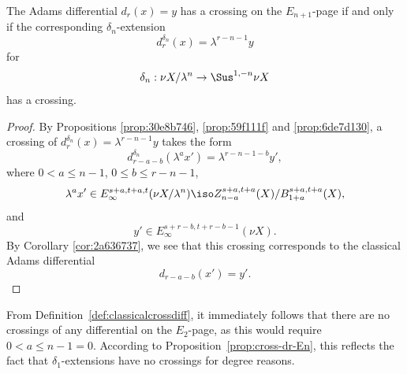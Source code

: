 \documentclass{amsart}
\numberwithin{equation}{section}
\begin{document}
\begin{proposition}\label{prop:cross-dr-En}
    The Adams differential $d_r(x)=y$ has a crossing on the $E_{n+1}$-page if and only if the corresponding $\delta_n$-extension
    $$d^{\delta_n}_r(x)=\lambda^{r-n-1}y$$
    for
    $$\delta_{n}:\nu X/\lambda^{n}\to \Sus^{1,-n}\nu X$$
    has a crossing.
\end{proposition}
\begin{proof}
    By Propositions \ref{prop:30e8b746}, \ref{prop:59f111f} and \ref{prop:6de7d130}, a crossing of $d^{\delta_n}_r(x)=\lambda^{r-n-1}y$ takes the form
    $$d^{\delta_n}_{r-a-b}(\lambda^a x')=\lambda^{r-n-1-b}y',$$
    where $0<a\le n-1$, $0\le b\le r-n-1$, 
    $$\lambda^a x'\in E_\infty^{s+a,t+a,t}(\nu X/\lambda^n)\iso Z_{n-a}^{s+a,t+a}(X)/B_{1+a}^{s+a,t+a}(X),$$
    and
    $$y'\in E_\infty^{s+r-b, t+r-b-1}(\nu X).$$
    By Corollary \ref{cor:2a636737}, we see that this crossing corresponds to the classical Adams differential
    $$d_{r-a-b}(x')=y'.$$
\end{proof}

\begin{remark} \label{nocrossE2}
    From Definition~\ref{def:classicalcrossdiff}, it immediately follows that there are no crossings of any differential on the $E_2$-page, as this would require $0< a \le n-1 = 0$. According to Proposition~\ref{prop:cross-dr-En}, this reflects the fact that $\delta_1$-extensions have no crossings for degree reasons.
\end{remark}
\end{document}
